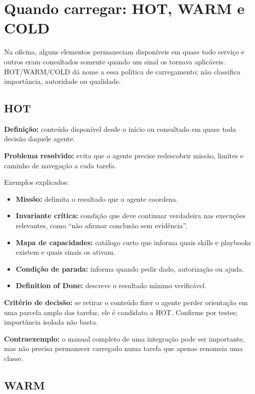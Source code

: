 \documentclass[
  10pt,
  a4paper,
  oneside]{book}
\providecommand{\tightlist}{%
  \setlength{\itemsep}{0pt}\setlength{\parskip}{0pt}}
\begin{document}
\hypertarget{quando-carregar-hot-warm-e-cold}{%
\section{Quando carregar: HOT, WARM e
COLD}\label{quando-carregar-hot-warm-e-cold}}

Na oficina, alguns elementos permaneciam disponíveis em quase todo
serviço e outros eram consultados somente quando um sinal os tornava
aplicáveis. HOT/WARM/COLD dá nome a essa política de carregamento; não
classifica importância, autoridade ou qualidade.

\hypertarget{hot}{%
\subsection{HOT}\label{hot}}

\textbf{Definição:} conteúdo disponível desde o início ou consultado em
quase toda decisão daquele agente.

\textbf{Problema resolvido:} evita que o agente precise redescobrir
missão, limites e caminho de navegação a cada tarefa.

Exemplos explicados:

\begin{itemize}
\tightlist
\item
  \textbf{Missão:} delimita o resultado que o agente coordena.
\item
  \textbf{Invariante crítica:} condição que deve continuar verdadeira
  nas execuções relevantes, como ``não afirmar conclusão sem
  evidência''.
\item
  \textbf{Mapa de capacidades:} catálogo curto que informa quais skills
  e playbooks existem e quais sinais os ativam.
\item
  \textbf{Condição de parada:} informa quando pedir dado, autorização ou
  ajuda.
\item
  \textbf{Definition of Done:} descreve o resultado mínimo verificável.
\end{itemize}

\textbf{Critério de decisão:} se retirar o conteúdo fizer o agente
perder orientação em uma parcela ampla das tarefas, ele é candidato a
HOT. Confirme por testes; importância isolada não basta.

\textbf{Contraexemplo:} o manual completo de uma integração pode ser
importante, mas não precisa permanecer carregado numa tarefa que apenas
renomeia uma classe.

\hypertarget{warm}{%
\subsection{WARM}\label{warm}}
\end{document}
